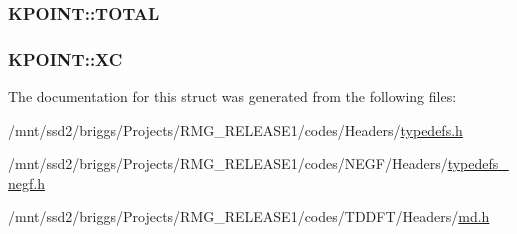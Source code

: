 \hypertarget{struct_k_p_o_i_n_t_a479d17908b44c4466931a5258a23a048}{
\subsubsection[{T\-O\-T\-A\-L}]{ K\-P\-O\-I\-N\-T\-::\-T\-O\-T\-A\-L}}\label{struct_k_p_o_i_n_t_a479d17908b44c4466931a5258a23a048}
\hypertarget{struct_k_p_o_i_n_t_a9fa3f8a209c5f7000ab17d611dd6df82}{
\subsubsection[{X\-C}]{ K\-P\-O\-I\-N\-T\-::\-X\-C}}\label{struct_k_p_o_i_n_t_a9fa3f8a209c5f7000ab17d611dd6df82}


The documentation for this struct was generated from the following files\-:\begin{DoxyCompactItemize}
\item 
/mnt/ssd2/briggs/\-Projects/\-R\-M\-G\-\_\-\-R\-E\-L\-E\-A\-S\-E1/codes/\-Headers/\hyperlink{_headers_2typedefs_8h}{typedefs.\-h}\item 
/mnt/ssd2/briggs/\-Projects/\-R\-M\-G\-\_\-\-R\-E\-L\-E\-A\-S\-E1/codes/\-N\-E\-G\-F/\-Headers/\hyperlink{typedefs__negf_8h}{typedefs\-\_\-negf.\-h}\item 
/mnt/ssd2/briggs/\-Projects/\-R\-M\-G\-\_\-\-R\-E\-L\-E\-A\-S\-E1/codes/\-T\-D\-D\-F\-T/\-Headers/\hyperlink{md_8h}{md.\-h}\end{DoxyCompactItemize}
